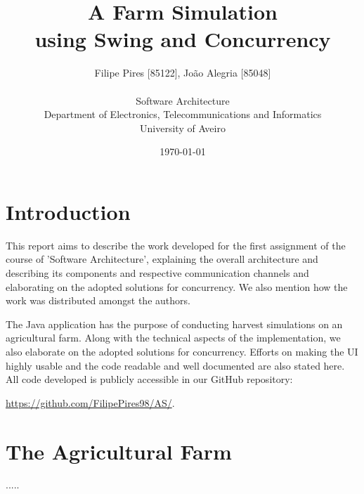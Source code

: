 \documentclass[12pt]{article}
\title{A Farm Simulation\\using Swing and Concurrency}
\author
{Filipe Pires [85122], João Alegria [85048]\\
\\
Software Architecture\\
\normalsize{Department of Electronics, Telecommunications and Informatics}\\
\normalsize{University of Aveiro}\\
}
\date{\today{}}
\begin{document}
 

\baselineskip18pt

\maketitle 

\section{Introduction} %

This report aims to describe the work developed for the first assignment of the course of 'Software Architecture', explaining the overall architecture and 
describing its components and respective communication channels and elaborating on the adopted solutions for concurrency.
We also mention how the work was distributed amongst the authors.

The Java application has the purpose of conducting harvest simulations on an agricultural farm.
Along with the technical aspects of the implementation, we also elaborate on the adopted solutions for concurrency.
Efforts on making the UI highly usable and the code readable and well documented are also stated here.
All code developed is publicly accessible in our GitHub repository: 

\url{https://github.com/FilipePires98/AS/}.
\newpage

\section{The Agricultural Farm} \label{farm} %

.....

\end{document}
